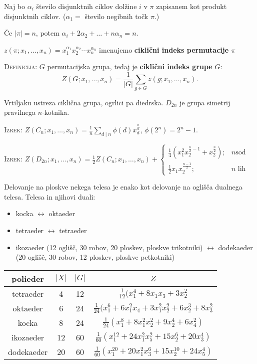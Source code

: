 \documentclass[8pt,a4paper]{amsart}
\theoremstyle{definition} %
\theoremstyle{plain} %
\begin{document}
Naj bo $\alpha_i$ število disjunktnih ciklov dolžine $i$ v $\pi$ zapisanem kot
produkt disjunktnih ciklov. ($\alpha_1 = $ število negibnih točk $\pi$.)

Če $|\pi| = n$, potem $\alpha_i + 2\alpha_2 + \ldots + n\alpha_n= n$.

$z(\pi ; x_1,\ldots ,x_n)=x_1^{\alpha_1}x_2^{\alpha_2}\cdots x_n^{\alpha_n}$
imenujemo \textbf{ciklični indeks permutacije $\pi$}

\textsc{Definicija:} $G$ permutacijska grupa, tedaj je \textbf{ciklični indeks
grupe} $G$:
$$ Z(G;x_1,\ldots ,x_n) = \frac{1}{|G|} \sum_{g\in G} z(g;x_1,\ldots ,x_n).$$

Vrtiljaku ustreza ciklična grupa, ogrlici pa diedrska. $D_{2n}$ je grupa
simetrij pravilnega $n$-kotnika.

\textsc{Izrek:} $Z(C_n; x_1,\ldots, x_n) = \frac{1}{n} \displaystyle \sum_{d
\mid n} \phi
(d)x_d^{\frac{n}{d}}$, \quad $\phi(2^n) = 2^n-1$.

\textsc{Izrek:} $Z(D_{2n}; x_1,\ldots,x_n) = \frac{1}{2} Z(C_n;x_1,\ldots,x_n) +
\begin{cases} \frac{1}{4}(x_1^2x_2^{\frac{n}{2}-1}+x_2^{\frac{n}{2}});& n \text{
  sod} \\ \frac{1}{2}x_1x_2^{\frac{n-1}{2}};& n \text{ lih} \end{cases}$

Delovanje na ploskve nekega telesa je enako kot delovanje na oglišča dualnega
telesa. Telesa in njihovi duali:
\begin{itemize}
  \item kocka $\leftrightarrow$ oktaeder
  \item tetraeder $\leftrightarrow$ tetraeder
  \item ikozaeder (12 oglišč, 30 robov, 20 ploskev, ploskve trikotniki) $\leftrightarrow$ dodekaeder (20
    oglišč, 30 robov, 12 ploskev, ploskve petkotniki)
\end{itemize}

\begin{tabular}{| c || c | c | c |}\hline
  polieder & $|X|$ & $|G|$ & $Z$ \\ \hline\hline
  tetraeder & 4 & 12 & $\frac{1}{12}(x_1^4+8x_1x_3 + 3x_2^2$\\ \hline
  oktaeder & 6 & 24 & $\frac{1}{24}(x_1^6+6x_1^2x_4 + 3x_1^2x_2^2+6x_2^3+8x_3^2$\\ \hline
  kocka & 8 & 24 & $\frac{1}{24}(x_1^8+8x_1^2x_2^2 + 9x_2^4 + 6x_4^2)$ \\ \hline
  ikozaeder & 12 & 60 & $\frac{1}{60}(x_1^{12} + 24x_1^2x_5^2 + 15x_2^6 + 20x_3^4)$ \\ \hline
  dodekaeder & 20 & 60 & $\frac{1}{60}(x_1^{20} + 20x_1^2x_3^6 + 15x_2^{10} + 24x_5^4)$ \\ \hline
\end{tabular}
\end{document}
